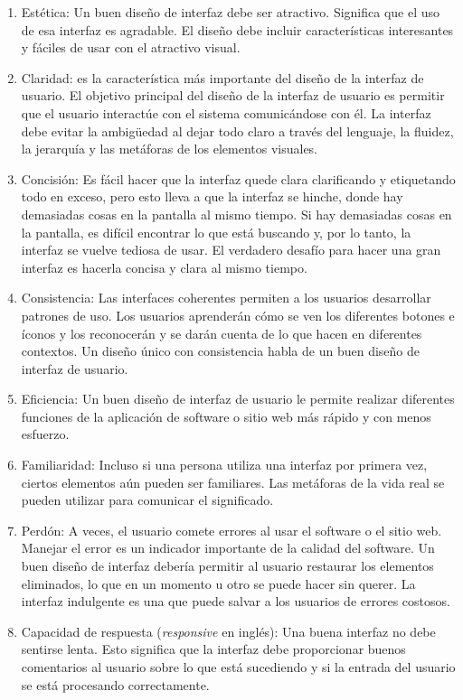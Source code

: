 \begin{enumerate}
\item Estética: Un buen diseño de interfaz debe ser atractivo. Significa que el uso de esa interfaz es agradable. El diseño debe incluir características interesantes y fáciles de usar con el atractivo visual.
\item Claridad: es la característica más importante del diseño de la interfaz de usuario. El objetivo principal del diseño de la interfaz de usuario es permitir que el usuario interactúe con el sistema comunicándose con él. La interfaz debe evitar la ambigüedad al dejar todo claro a través del lenguaje, la fluidez, la jerarquía y las metáforas de los elementos visuales.
\item Concisión: Es fácil hacer que la interfaz quede clara clarificando y etiquetando todo en exceso, pero esto lleva a que la interfaz se hinche, donde hay demasiadas cosas en la pantalla al mismo tiempo. Si hay demasiadas cosas en la pantalla, es difícil encontrar lo que está buscando y, por lo tanto, la interfaz se vuelve tediosa de usar. El verdadero desafío para hacer una gran interfaz es hacerla concisa y clara al mismo tiempo.
\item Consistencia: Las interfaces coherentes permiten a los usuarios desarrollar patrones de uso. Los usuarios aprenderán cómo se ven los diferentes botones e íconos y los reconocerán y se darán cuenta de lo que hacen en diferentes contextos. Un diseño único con consistencia habla de un buen diseño de interfaz de usuario.
\item Eficiencia: Un buen diseño de interfaz de usuario le permite realizar diferentes funciones de la aplicación de software o sitio web más rápido y con menos esfuerzo.
\item Familiaridad: Incluso si una persona utiliza una interfaz por primera vez, ciertos elementos aún pueden ser familiares. Las metáforas de la vida real se pueden utilizar para comunicar el significado.
\item Perdón: A veces, el usuario comete errores al usar el software o el sitio web. Manejar el error es un indicador importante de la calidad del software. Un buen diseño de interfaz debería permitir al usuario restaurar los elementos eliminados, lo que en un momento u otro se puede hacer sin querer. La interfaz indulgente es una que puede salvar a los usuarios de errores costosos.
\item Capacidad de respuesta (\textit{responsive} en inglés): Una buena interfaz no debe sentirse lenta. Esto significa que la interfaz debe proporcionar buenos comentarios al usuario sobre lo que está sucediendo y si la entrada del usuario se está procesando correctamente.

\end{enumerate}
